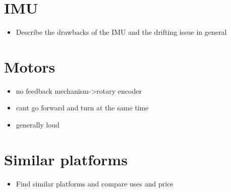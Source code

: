 \section{IMU}\label{imu_lim}
\begin{itemize}
 \item Describe the drawbacks of the IMU and the drifting issue in general
\end{itemize}

\section{Motors}\label{motor_lim}
\begin{itemize}
 \item no feedback mechanism->rotary encoder
 \item cant go forward and turn at the same time
 \item generally loud
\end{itemize}

\section{Similar platforms}\label{sec:similar_platforms}
\begin{itemize}
 \item Find similar platforms and compare uses and price
\end{itemize}





